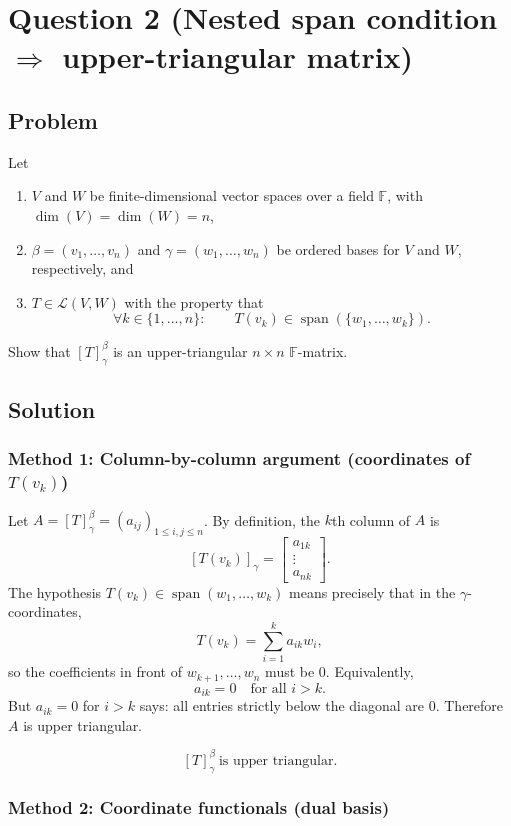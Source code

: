 \documentclass[12pt]{article}
\newcommand{\F}{\mathbb{F}}
\newcommand{\cL}{\mathcal{L}}
\newcommand{\Span}{\operatorname{span}}
\begin{document}
\section{Question 2 (Nested span condition $\Rightarrow$ upper-triangular matrix)}
\subsection{Problem}
Let
\begin{enumerate}[label=(\roman*)]
\item $V$ and $W$ be finite-dimensional vector spaces over a field $\F$, with $\dim(V)=\dim(W)=n$,
\item $\beta=(v_1,\dots,v_n)$ and $\gamma=(w_1,\dots,w_n)$ be ordered bases for $V$ and $W$, respectively, and
\item $T\in\cL(V,W)$ with the property that
\[
\forall k\in\{1,\dots,n\}:\qquad T(v_k)\in \Span(\{w_1,\dots,w_k\}).
\]
\end{enumerate}
Show that $[T]_{\gamma}^{\beta}$ is an upper-triangular $n\times n$ $\F$-matrix.

\subsection{Solution}

\subsubsection{Method 1: Column-by-column argument (coordinates of $T(v_k)$)}
Let $A=[T]_{\gamma}^{\beta}=(a_{ij})_{1\le i,j\le n}$. By definition, the $k$th column of $A$ is
\[
[T(v_k)]_{\gamma}=
\begin{bmatrix}
a_{1k}\\ \vdots \\ a_{nk}
\end{bmatrix}.
\]
The hypothesis $T(v_k)\in \Span(w_1,\dots,w_k)$ means precisely that in the $\gamma$-coordinates,
\[
T(v_k)=\sum_{i=1}^k a_{ik} w_i,
\]
so the coefficients in front of $w_{k+1},\dots,w_n$ must be $0$. Equivalently,
\[
a_{ik}=0\quad\text{for all }i>k.
\]
But $a_{ik}=0$ for $i>k$ says: all entries strictly below the diagonal are $0$.
Therefore $A$ is upper triangular.

\[
\boxed{\, [T]_{\gamma}^{\beta}\ \text{is upper triangular.}\,}
\]

\newpage
\subsubsection{Method 2: Coordinate functionals (dual basis)}
\end{document}
